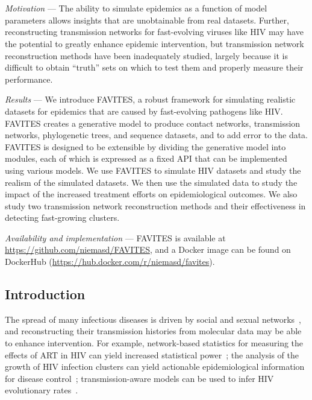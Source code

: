 \chapter{\favitestitle}
\label{chap:favites}
\clearpage

\textit{Motivation} --- The ability to simulate epidemics as a function of model parameters allows insights that are unobtainable from real datasets. Further, reconstructing transmission networks for fast-evolving viruses like \gls{HIV} may have the potential to greatly enhance epidemic intervention, but transmission network reconstruction methods have been inadequately studied, largely because it is difficult to obtain ``truth'' sets on which to test them and properly measure their performance.

\textit{Results} --- We introduce FAVITES, a robust framework for simulating realistic datasets for epidemics that are caused by fast-evolving pathogens like \gls{HIV}. FAVITES creates a generative model to produce contact networks, transmission networks, phylogenetic trees, and sequence datasets, and to add error to the data. FAVITES is designed to be extensible by dividing the generative model into modules, each of which is expressed as a fixed \gls{API} that can be implemented using various models. We use FAVITES to simulate \gls{HIV} datasets and study the realism of the simulated datasets. We then use the simulated data to study the impact of the increased treatment efforts on epidemiological outcomes. We also study two transmission network reconstruction methods and their effectiveness in detecting fast-growing clusters.

\textit{Availability and implementation} --- FAVITES is available at \url{https://github.com/niemasd/FAVITES}, and a Docker image  can be found on DockerHub (\url{https://hub.docker.com/r/niemasd/favites}).

\section{Introduction}
The spread of many infectious diseases is driven by social and sexual networks~\cite{Kelly1991}, and reconstructing their transmission histories from molecular data may be able to enhance intervention. For example, network-based statistics for measuring the effects of \gls{ART} in \gls{HIV} can yield increased statistical power~\cite{Wertheim2011}; the analysis of the growth of \gls{HIV} infection clusters can yield actionable epidemiological information for disease control~\cite{Lewis2008}; transmission-aware models can be used to infer \gls{HIV} evolutionary rates~\cite{Vrancken2014}.


